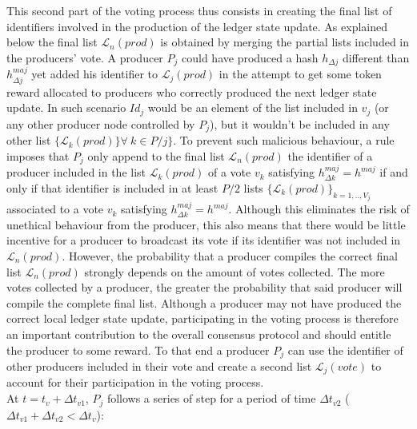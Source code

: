 This  second part of the voting process thus consists in creating the final list of identifiers involved in the production of the ledger state update. As explained below the final list $\mathcal{L}_n(prod)$ is obtained by merging the partial lists included in the producers' vote.
A producer $P_j$ could have produced a hash $h_{\Delta j}$ different than $h^{maj}_{\Delta j}$ yet added his identifier to $\mathcal{L}_j(prod)$ in the attempt to get some token reward allocated to producers who correctly produced the next ledger state update. In such scenario $Id_j$ would be an element of the list included in $v_j$ (or any other producer node controlled by $P_j$), but it wouldn't be included in any other list $\{\mathcal{L}_k(prod)\} \forall~k \in P/j\}$. To prevent such malicious behaviour, a rule imposes that $P_j$ only append to the final list $\mathcal{L}_n(prod)$ the identifier of a producer included in the list $\mathcal{L}_k(prod)$ of a vote $v_k$ satisfying $h^{maj}_{\Delta k} = h^{maj}$ if and only if that identifier is included in at least $P/2$ lists $\{\mathcal{L}_{k}(prod)\}_{k=1,..,V_j}$ associated to a vote $v_{k}$ satisfying $h^{maj}_{\Delta k} = h^{maj}$. Although this eliminates the risk of unethical behaviour from the producer, this also means that there would be little incentive for a producer to broadcast its vote if its identifier was not included in $\mathcal{L}_n(prod)$. However, the probability that a producer compiles the correct final list $\mathcal{L}_n(prod)$ strongly depends on the amount of votes collected. The more votes collected by a producer, the greater the probability that said producer will compile the complete final list. Although a producer may not have produced the correct local ledger state update, participating in the voting process is therefore an important contribution to the overall consensus protocol and should entitle the producer to some reward. To that end a producer $P_j$ can use the identifier of other producers included in their vote and create a second list $\mathcal{L}_j(vote)$ to account for their participation in the voting process. \\
 
At $t = t_v +  \Delta t_{v1}$,  $P_j$ follows a series of step for a period of time $\Delta t_{v2}$ ($\Delta t_{v1} + \Delta t_{v2} < \Delta t_{v}$):

